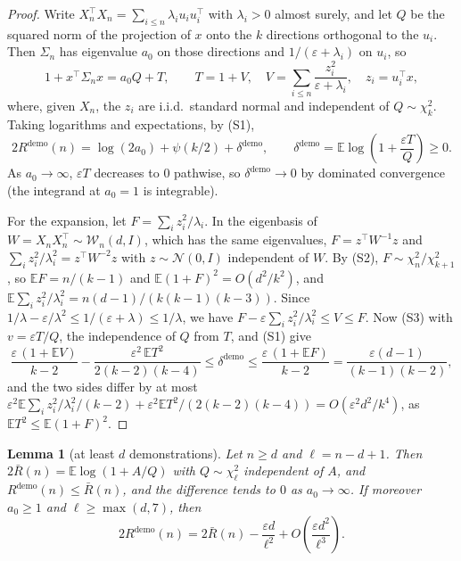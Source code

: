 \documentclass{article}
\newtheorem{lemma}[theorem]{Lemma}
\newcommand{\E}{\mathbb{E}}
\begin{document}
\begin{proof}
Write $X_n^\top X_n = \sum_{i \le n} \lambda_i u_i u_i^\top$ with $\lambda_i > 0$ almost surely, and let $Q$ be the squared norm of the projection of $x$ onto the $k$ directions orthogonal to the $u_i$. Then $\Sigma_n$ has eigenvalue $a_0$ on those directions and $1/(\varepsilon + \lambda_i)$ on $u_i$, so
\[
1 + x^\top \Sigma_n x = a_0 Q + T, \qquad T = 1 + V, \quad V = \sum_{i \le n} \frac{z_i^2}{\varepsilon + \lambda_i}, \quad z_i = u_i^\top x,
\]
where, given $X_n$, the $z_i$ are i.i.d.\ standard normal and independent of $Q \sim \chi^2_k$. Taking logarithms and expectations, by (S1),
\[
2R^{\mathrm{demo}}(n) = \log(2a_0) + \psi(k/2) + \delta^{\mathrm{demo}}, \qquad \delta^{\mathrm{demo}} = \E \log\!\left(1 + \frac{\varepsilon T}{Q}\right) \ge 0 .
\]
As $a_0 \to \infty$, $\varepsilon T$ decreases to $0$ pathwise, so $\delta^{\mathrm{demo}} \to 0$ by dominated convergence (the integrand at $a_0 = 1$ is integrable).

For the expansion, let $F = \sum_i z_i^2 / \lambda_i$. In the eigenbasis of $W = X_n X_n^\top \sim \mathcal{W}_n(d, I)$, which has the same eigenvalues, $F = z^\top W^{-1} z$ and $\sum_i z_i^2/\lambda_i^2 = z^\top W^{-2} z$ with $z \sim \mathcal{N}(0, I)$ independent of $W$. By (S2), $F \sim \chi^2_n / \chi^2_{k+1}$, so $\E F = n/(k-1)$ and $\E (1+F)^2 = O(d^2/k^2)$, and $\E \sum_i z_i^2/\lambda_i^2 = n(d-1)/(k(k-1)(k-3))$. Since $1/\lambda - \varepsilon/\lambda^2 \le 1/(\varepsilon + \lambda) \le 1/\lambda$, we have $F - \varepsilon \sum_i z_i^2/\lambda_i^2 \le V \le F$. Now (S3) with $v = \varepsilon T / Q$, the independence of $Q$ from $T$, and (S1) give
\[
\frac{\varepsilon\,(1 + \E V)}{k-2} - \frac{\varepsilon^2\, \E T^2}{2(k-2)(k-4)} \le \delta^{\mathrm{demo}} \le \frac{\varepsilon\,(1 + \E F)}{k-2} = \frac{\varepsilon (d-1)}{(k-1)(k-2)} ,
\]
and the two sides differ by at most $\varepsilon^2 \E \sum_i z_i^2/\lambda_i^2 /(k-2) + \varepsilon^2 \E T^2 / (2(k-2)(k-4)) = O(\varepsilon^2 d^2 / k^4)$, as $\E T^2 \le \E (1 + F)^2$.
\end{proof}

\begin{lemma}[at least $d$ demonstrations]\label{lem:many}
Let $n \ge d$ and $\ell = n - d + 1$. Then $2\bar R(n) = \E \log(1 + A/Q)$ with $Q \sim \chi^2_\ell$ independent of $A$, and $R^{\mathrm{demo}}(n) \le \bar R(n)$, and the difference tends to $0$ as $a_0 \to \infty$. If moreover $a_0 \ge 1$ and $\ell \ge \max(d, 7)$, then
\[
2R^{\mathrm{demo}}(n) = 2\bar R(n) - \frac{\varepsilon d}{\ell^2} + O\!\left(\frac{\varepsilon d^2}{\ell^3}\right).
\]
\end{lemma}
\end{document}
